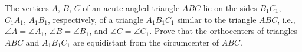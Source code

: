 The vertices \(A\), \(B\), \(C\) of an acute-angled triangle \(ABC\) lie on the sides \(B_1C_1\), \(C_1A_1\), \(A_1B_1\), respectively, of a triangle \(A_1B_1C_1\) similar to the triangle \(ABC\), i.e., \(\angle A = \angle A_1\), \(\angle B = \angle B_1\), and \(\angle C = \angle C_1\).
Prove that the orthocenters of triangles \(ABC\) and \(A_1B_1C_1\) are equidistant from the circumcenter of \(ABC\).
